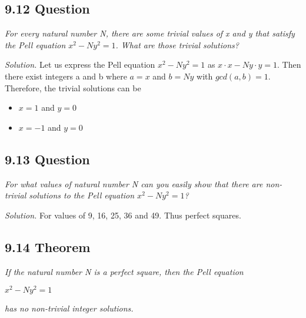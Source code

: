 \documentclass{article}
\begin{document}
\subsection*{9.12 Question} 
\quad \textit{For every natural number N, there are some trivial values of x and y that satisfy the Pell equation $x^2 - Ny^2 = 1$. What are those trivial solutions?}

\textit{Solution.} Let us express the Pell equation $x^2 - Ny^2 = 1$ as $x \cdot x - Ny \cdot y = 1$. Then there exist integers a and b where $a = x$ and $b = Ny$ with $gcd(a, b) = 1$. Therefore, the trivial solutions can be
\begin{itemize}
    \item $x = 1$ and $y = 0$
    \item $x = -1$ and $y = 0$
\end{itemize}

\subsection*{9.13 Question} 
\quad \textit{For what values of natural number N can you easily show that there are non-trivial solutions to the Pell equation $x^2-Ny^2 = 1$?}

\textit{Solution.} For values of 9, 16, 25, 36 and 49. Thus perfect squares.

\subsection*{9.14 Theorem} 
\quad \textit{If the natural number N is a perfect square, then the Pell equation}
\begin{center}
    $x^2-Ny^2 = 1$
\end{center}
\textit{has no non-trivial integer solutions.}
\end{document}
